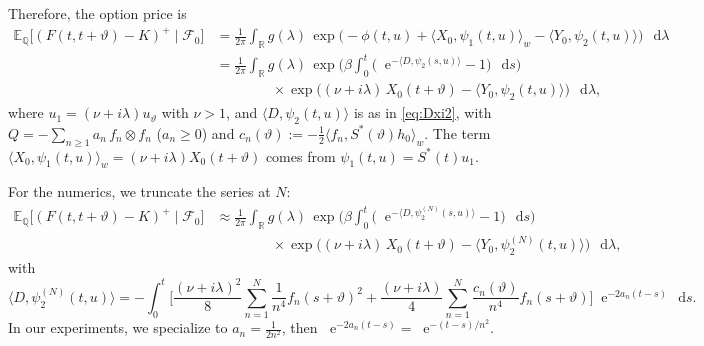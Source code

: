 \documentclass[10pt,a4paper,reqno]{amsart}
\newcommand*\D{\mathop{}\!\mathrm{d}}
\newcommand*\E{\mathop{}\!\mathrm{e}}
\numberwithin{equation}{section}
\theoremstyle{plain}
\theoremstyle{definition}
\theoremstyle{example}
\renewcommand{\MR}{\mathbb{R}}
\newcommand{\MQ}{\mathbb{Q}}
\newcommand{\R}{\MR}
\newcommand{\cF}{\mathcal{F}}
\begin{document}
Therefore, the option price is
\begin{equation}\label{eq:option1_b0}
\begin{aligned}
\mathbb{E}_{\MQ}\big[(F(t,t+\vartheta)-K)^+\mid \cF_0\big]
&= \frac{1}{2\pi}\int_{\R} g(\lambda)\,
   \exp\Big(
      -\phi(t,u) + \langle X_0,\psi_1(t,u)\rangle_w - \langle Y_0,\psi_2(t,u)\rangle
   \Big)\,\D\lambda \\
&= \frac{1}{2\pi}\int_{\R} g(\lambda)\,
   \exp\Big(
      \beta\!\int_0^t \!\big(\E^{-\langle D,\psi_2(s,u)\rangle}-1\big)\,\D s\big)
      \\ &\qquad\qquad \times\exp\Big( (\nu+i\lambda)\,X_0(t+\vartheta)
      - \langle Y_0,\psi_2(t,u)\rangle\Big)\,\D\lambda,
\end{aligned}
\end{equation}
where $u_1=(\nu+i\lambda)u_\vartheta$ with $\nu>1$, and $\langle D,\psi_2(t,u)\rangle$ is as in \eqref{eq:Dxi2}, 
with $Q=-\sum_{n\ge1} a_n\,f_n\otimes f_n$ ($a_n\ge0$) and $c_n(\vartheta):=-\tfrac12\langle f_n,S^*(\vartheta)h_0\rangle_w$.
The term $\langle X_0,\psi_1(t,u)\rangle_w=(\nu+i\lambda)X_0(t+\vartheta)$ comes from $\psi_1(t,u)=S^*(t)u_1$.

For the numerics, we truncate the series at $N$:
\begin{equation}\label{eq:option1_b0_trunc}
\begin{aligned}
\mathbb{E}_{\MQ}\big[(F(t,t+\vartheta)-K)^+\mid \cF_0\big]
&\approx \frac{1}{2\pi}\int_{\R} g(\lambda)\,
   \exp\Big(
      \beta\!\int_0^t \!\big(\E^{-\langle D,\psi_2^{(N)}(s,u)\rangle}-1\big)\,\D s\Big) \\
      &\qquad\qquad\times \exp\Big((\nu+i\lambda)\,X_0(t+\vartheta)
      - \langle Y_0,\psi_2^{(N)}(t,u)\rangle
   \Big)\,\D\lambda,
\end{aligned}
\end{equation}
with
$$
\langle D,\psi_2^{(N)}(t,u)\rangle
= -\int_0^t\Big[
   \frac{(\nu+i\lambda)^2}{8}\sum_{n=1}^{N}\frac{1}{n^4} f_n(s+\vartheta)^2
 + \frac{(\nu+i\lambda)}{4}\sum_{n=1}^{N}\frac{c_n(\vartheta)}{n^4} f_n(s+\vartheta)
 \Big] \E^{-2a_n(t-s)}\,\D s.
$$
In our experiments, we specialize to $a_n=\frac{1}{2n^2}$, then $\E^{-2a_n(t-s)}=\E^{-(t-s)/n^2}$. \medskip
\end{document}
